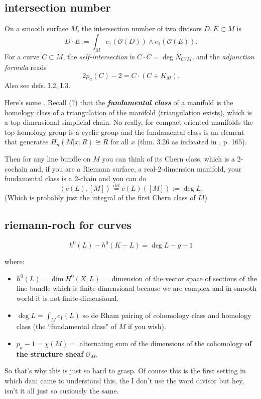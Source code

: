 \subsection{intersection number}
On a smooth surface \( M \), the intersection number of two divisors \( D, E \subset M \) is
\[
D \cdot E := \int_M c_1(\mathcal{O}(D)) \wedge c_1(\mathcal{O}(E)).
\]
For a curve \( C \subset M \), the \emph{self-intersection} is \( C \cdot C = \deg N_{C/M} \), and the \emph{adjunction formula} reads
\[
2p_a(C) - 2 = C \cdot (C + K_M).
\]
Also see \cite{beu} defs. I.2, I.3.

Here's some \cite{lec}. Recall (?) that the \textit{\textbf{fundamental class}} of a manifold is the homology class of a triangulation of the manifold (triangulation exists), which is a top-dimensional simplicial chain. No really, for compact oriented manifolds the top homology group is a cyclic group and the fundamental class is an element that generates \(H_n(M|x,R)\cong R\) for all \(x\) (thm. 3.26 \cite{hat} as indicated in \cite{lec}, p. 165).

Then for any line bundle on  \(M\) you can think of its Chern class, which is a 2-cochain and, if you are a Riemann surface, a real-2-dimension manifold, your fundamental class is a 2-chain and you can do
\[\left<c(L),[M]\right>\overset{\operatorname{def}}{=}c(L)([M]):=\operatorname{deg}L.\]
(Which is probably just the integral of the first Chern class of \(L\)!)


\subsection{riemann-roch for curves}
	\[\boxed{h^0(L)-h^0(K-L)=\operatorname{deg}L-g+1}\]

where:
\begin{itemize}
\item \(h^0(L)=\dim H^{0}(X,L)=\) dimension of the vector space of sections of the line bundle which is finite-dimensional because we are complex and in smooth world it is not finite-dimensional.
\item \(\operatorname{deg}L=\int_M c_1(L)\) so de Rham pairing of cohomology class and homology  class (the ``fundamental class" of \(M\) if you wish).
 \item \(p_a-1=\chi(M)=\) alternating sum of the dimensions of the cohomology \textbf{of the structure sheaf} \(\mathcal{O}_M\).
\end{itemize}
So that's why this is just so hard to grasp. Of course this is the first setting in which dani came to understand this, the I don't use the word divisor but hey, isn't it all just so cusiously the same.

